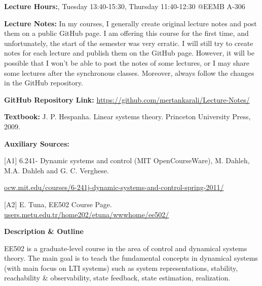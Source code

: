 \documentclass[11pt,oneside]{amsart}
\newcommand{\header}[1]{\bigbreak\textbf{#1}}
\begin{document}
\vspace{9pt}

\textbf{Lecture Hours:}, Tuesday 13:40-15:30, Thursday 11:40-12:30
@EEMB A-306

\vspace{9pt}

\textbf{Lecture Notes:} In my courses, I generally create original
lecture notes and post them on a public GitHub page. I am offering
this course for the first time, and unfortunately, the start of the
semester was very erratic. I will still try to create notes for each
lecture and publish them on the GitHub page. However, it will be
possible that I won't be able to post the notes of some lectures, or
I may share some lectures after the synchronous classes. Moreover, always follow the changes in the GitHub repository. 

\vspace{6pt}

\textbf{GitHub Repository Link:} \url{https://github.com/mertankarali/Lecture-Notes/}

\vspace{6pt}

\textbf{Textbook:} J. P. Hespanha. Linear systems theory. Princeton
University Press, 2009.

\vspace{6pt}

\textbf{Auxiliary Sources:}

\vspace{6pt}

[A1] 6.241- Dynamic systems and control (MIT OpenCourseWare),
    M. Dahleh, M.A. Dahleh and G. C. Verghese. 

\url{ocw.mit.edu/courses/6-241j-dynamic-systems-and-control-spring-2011/}

\vspace{5pt}

[A2] E. Tuna, EE502 Course Page. \url{users.metu.edu.tr/home202/etuna/wwwhome/ee502/}


\newpage

\header{Description \& Outline}

\vspace{6pt}

EE502 is a graduate-level course in the area of control and dynamical
systems theory. 
The main goal is to teach the fundamental concepts in dynamical systems (with
main focus on LTI systems) such as system representations, stability,
reachability \& observability, state feedback, state estimation,
realization. 
\end{document}
